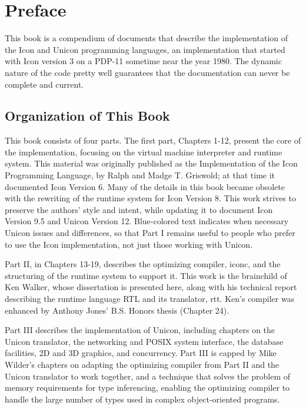 \chapter{Preface}

This book is a compendium of documents that describe the
implementation of the Icon and Unicon programming languages, an
implementation that started with Icon version 3 on a PDP-11 sometime
near the year 1980. The dynamic nature of the code pretty well
guarantees that the documentation can never be complete and current.

\section*{Organization of This Book}

This book consists of four parts. The first part, Chapters 1-12,
present the core of the implementation, focusing on the virtual
machine interpreter and runtime system. This material was originally
published as the Implementation of the Icon Programming Language, by
Ralph and Madge T. Griswold; at that time it documented Icon Version
6. Many of the details in this book became obsolete with the rewriting
of the runtime system for Icon Version 8. This work strives to
preserve the authors' style and intent, while updating
it to document Icon Version 9.5 and Unicon Version 12. Blue-colored
text indicates when necessary Unicon issues and differences, so that
Part I remains useful to people who prefer to use the Icon
implementation, not just those working with Unicon.

Part II, in Chapters 13-19, describes the optimizing compiler, iconc,
and the structuring of the runtime system to support it. This work is
the brainchild of Ken Walker, whose dissertation is presented here,
along with his technical report describing the runtime language RTL
and its translator, rtt. Ken's compiler was enhanced by Anthony Jones'
B.S. Honors thesis (Chapter 24).

Part III describes the implementation of Unicon, including chapters on
the Unicon translator, the networking and POSIX system interface, the
database facilities, 2D and 3D graphics, and concurrency.  Part III is
capped by Mike Wilder's chapters on adapting the optimizing compiler
from Part II and the Unicon translator to work together, and a
technique that solves the problem of memory requirements for type
inferencing, enabling the optimizing compiler to handle the large
number of types used in complex object-oriented programs.


